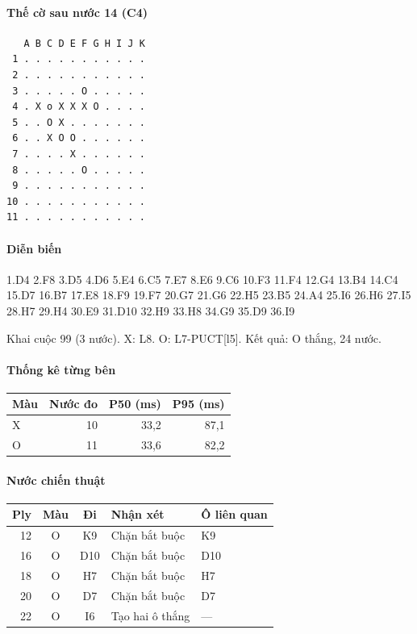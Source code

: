 \paragraph{Thế cờ sau nước 14 (C4)}
\begin{verbatim}
   A B C D E F G H I J K
 1 . . . . . . . . . . .
 2 . . . . . . . . . . .
 3 . . . . . O . . . . .
 4 . X o X X X O . . . .
 5 . . O X . . . . . . .
 6 . . X O O . . . . . .
 7 . . . . X . . . . . .
 8 . . . . . O . . . . .
 9 . . . . . . . . . . .
10 . . . . . . . . . . .
11 . . . . . . . . . . .
\end{verbatim}
\paragraph{Diễn biến}
{\footnotesize 1.D4 2.F8 3.D5 4.D6 5.E4 6.C5 7.E7 8.E6 9.C6 10.F3 11.F4 12.G4 13.B4 14.C4 15.D7 16.B7 17.E8 18.F9 19.F7 20.G7 21.G6 22.H5 23.B5 24.A4 25.I6 26.H6 27.I5 28.H7 29.H4 30.E9 31.D10 32.H9 33.H8 34.G9 35.D9 36.I9\par}
Khai cuộc 99 (3 nước). X: L8. O: L7-PUCT[l5]. Kết quả: O thắng, 24 nước.
\paragraph{Thống kê từng bên}
\begin{center}\small
\begin{tabular}{@{}lrrr@{}}
\toprule
Màu & Nước đo & P50 (ms) & P95 (ms) \\
\midrule
X & 10 & 33,2 & 87,1 \\
O & 11 & 33,6 & 82,2 \\
\bottomrule
\end{tabular}
\end{center}
\paragraph{Nước chiến thuật}
\begin{center}\small
\begin{tabular}{@{}rccll@{}}
\toprule
Ply & Màu & Đi & Nhận xét & Ô liên quan \\
\midrule
12 & O & K9 & Chặn bắt buộc & K9 \\
16 & O & D10 & Chặn bắt buộc & D10 \\
18 & O & H7 & Chặn bắt buộc & H7 \\
20 & O & D7 & Chặn bắt buộc & D7 \\
22 & O & I6 & Tạo hai ô thắng & — \\
\bottomrule
\end{tabular}
\end{center}
